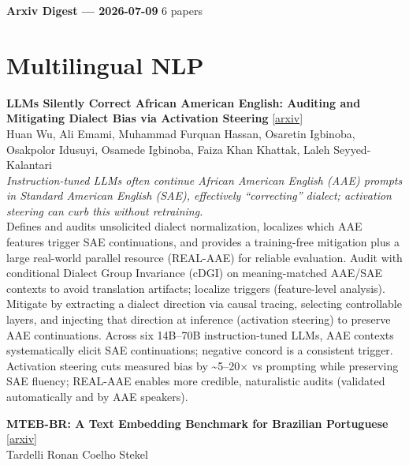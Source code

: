 \documentclass[12pt,letterpaper]{article}
\begin{document}
{\footnotesize\textbf{Arxiv Digest --- 2026-07-09} \hfill 6 papers}

\smallskip

\section*{Multilingual NLP}

{\small\textbf{LLMs Silently Correct African American English: Auditing and Mitigating Dialect Bias via Activation Steering}} {\scriptsize[\href{https://arxiv.org/abs/2607.06845}{arxiv}]}\\
{\scriptsize Huan Wu, Ali Emami, Muhammad Furquan Hassan, Osaretin Igbinoba, Osakpolor Idusuyi, Osamede Igbinoba, Faiza Khan Khattak, Laleh Seyyed-Kalantari}\\

{\small\textit{Instruction-tuned LLMs often continue African American English (AAE) prompts in Standard American English (SAE), effectively ``correcting'' dialect; activation steering can curb this without retraining.}}\\[1pt]
{\footnotesize Defines and audits unsolicited dialect normalization, localizes which AAE features trigger SAE continuations, and provides a training-free mitigation plus a large real-world parallel resource (REAL-AAE) for reliable evaluation. Audit with conditional Dialect Group Invariance (cDGI) on meaning-matched AAE/SAE contexts to avoid translation artifacts; localize triggers (feature-level analysis). Mitigate by extracting a dialect direction via causal tracing, selecting controllable layers, and injecting that direction at inference (activation steering) to preserve AAE continuations. Across six 14B--70B instruction-tuned LLMs, AAE contexts systematically elicit SAE continuations; negative concord is a consistent trigger. Activation steering cuts measured bias by \textasciitilde{}5--20× vs prompting while preserving SAE fluency; REAL-AAE enables more credible, naturalistic audits (validated automatically and by AAE speakers).}

\medskip

{\small\textbf{MTEB-BR: A Text Embedding Benchmark for Brazilian Portuguese}} {\scriptsize[\href{https://arxiv.org/abs/2607.04581}{arxiv}]}\\
{\scriptsize Tardelli Ronan Coelho Stekel}\\
\end{document}
